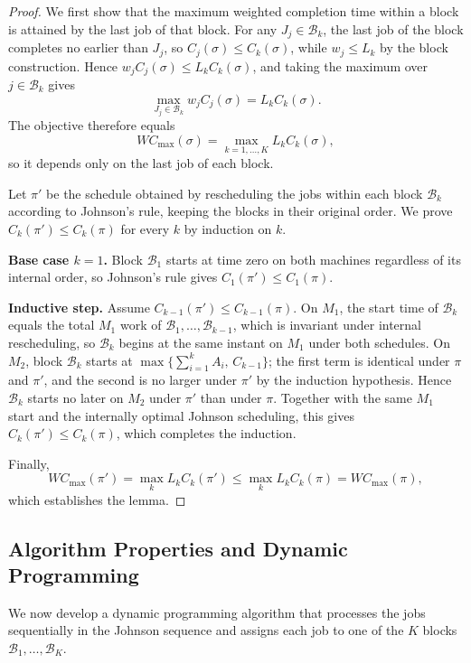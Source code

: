 \documentclass[12pt]{article}
\let\origsubsection\subsection
\renewcommand{\subsection}{\FloatBarrier\origsubsection}
\begin{document}
\begin{sloppypar}
\begin{proof}
We first show that the maximum weighted completion time within a block is attained by the last job of
that block. For any $J_j \in \mathcal{B}_k$, the last job of the block completes no earlier than
$J_j$, so $C_j(\sigma) \le C_k(\sigma)$, while $w_j \le L_k$ by the block construction. Hence
$w_j C_j(\sigma) \le L_k C_k(\sigma)$, and taking the maximum over $j \in \mathcal{B}_k$ gives
\[
\max_{J_j \in \mathcal{B}_k} w_j C_j(\sigma) = L_k C_k(\sigma).
\]
The objective therefore equals
\[
W C_{\max}(\sigma) = \max_{k=1,\dots,K} L_k C_k(\sigma),
\]
so it depends only on the last job of each block.

Let $\pi'$ be the schedule obtained by rescheduling the jobs within each block $\mathcal{B}_k$
according to Johnson's rule, keeping the blocks in their original order. We prove
$C_k(\pi') \le C_k(\pi)$ for every $k$ by induction on $k$.

\textbf{Base case $k=1$.}
Block $\mathcal{B}_1$ starts at time zero on both machines regardless of its internal order, so
Johnson's rule gives $C_1(\pi') \le C_1(\pi)$.

\textbf{Inductive step.}
Assume $C_{k-1}(\pi') \le C_{k-1}(\pi)$. On $M_1$, the start time of $\mathcal{B}_k$ equals the
total $M_1$ work of $\mathcal{B}_1,\dots,\mathcal{B}_{k-1}$, which is invariant under internal
rescheduling, so $\mathcal{B}_k$ begins at the same instant on $M_1$ under both schedules. On $M_2$,
block $\mathcal{B}_k$ starts at $\max\{\sum_{i=1}^{k}A_{i},\,C_{k-1}\}$; the first term is identical
under $\pi$ and $\pi'$, and the second is no larger under $\pi'$ by the induction hypothesis. Hence
$\mathcal{B}_k$ starts no later on $M_2$ under $\pi'$ than under $\pi$. Together with the same $M_1$
start and the internally optimal Johnson scheduling, this gives $C_k(\pi') \le C_k(\pi)$, which
completes the induction.

Finally,
\[
W C_{\max}(\pi') = \max_{k} L_k C_k(\pi') \le \max_{k} L_k C_k(\pi) = W C_{\max}(\pi),
\]
which establishes the lemma.
\end{proof}




\subsection{Algorithm Properties and Dynamic Programming}
We now develop a dynamic programming algorithm that processes the jobs sequentially in the Johnson
sequence and assigns each job to one of the $K$ blocks $\mathcal{B}_1,\dots,\mathcal{B}_K$.


\end{sloppypar}
\end{document}
